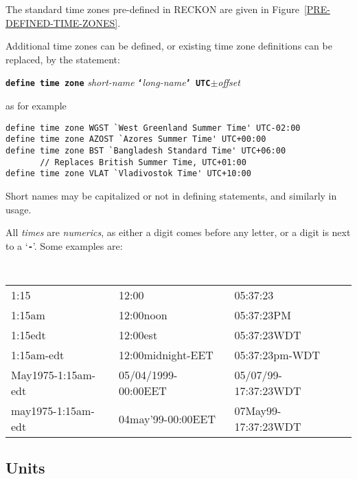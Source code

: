 \documentclass[12pt]{article}
\newcommand{\TT}[1]{{\tt \bfseries #1}}
\newenvironment{indpar}[1][0.3in]%
	{\begin{list}{}%
		     {\setlength{\itemsep}{0in}%
		      \setlength{\topsep}{0in}%
		      \setlength{\parsep}{1ex}%
		      \setlength{\labelwidth}{#1}%
		      \setlength{\leftmargin}{#1}%
		      \addtolength{\leftmargin}{\labelsep}}%
	 \item}%
	{\end{list}}
\begin{document}
The standard time zones pre-defined in RECKON are given in
Figure~\ref{PRE-DEFINED-TIME-ZONES}.

Additional time zones can be defined, or existing time zone
definitions can be replaced, by the statement:
\begin{center}
\TT{define time zone} {\em short-name}
    \TT{`}{\em long-name}\TT{' UTC}$\pm${\em offset}
\end{center}

as for example
\begin{indpar}\begin{verbatim}
define time zone WGST `West Greenland Summer Time' UTC-02:00
define time zone AZOST `Azores Summer Time' UTC+00:00
define time zone BST `Bangladesh Standard Time' UTC+06:00
       // Replaces British Summer Time, UTC+01:00
define time zone VLAT `Vladivostok Time' UTC+10:00
\end{verbatim}\end{indpar}

Short names may be capitalized or not in defining statements, and
similarly in usage.

All {\em times} are {\em numerics}, as either a digit comes before
any letter, or a digit is next to a `\TT{-}'.  Some examples are:

\begin{indpar}[0.1in]
\tt
\begin{tabular}{@{}l@{~~}l@{~~}l@{}}
1:15	& 12:00   & 05:37:23 \\
1:15am	& 12:00noon   & 05:37:23PM \\
1:15edt	& 12:00est   & 05:37:23WDT \\
1:15am-edt	& 12:00midnight-EET   & 05:37:23pm-WDT \\
May1975-1:15am-edt	& 05/04/1999-00:00EET   & 05/07/99-17:37:23WDT \\
may1975-1:15am-edt	& 04may'99-00:00EET   & 07May99-17:37:23WDT \\
\end{tabular}
\end{indpar}

\subsection{Units}
\label{UNITS}
\end{document}
